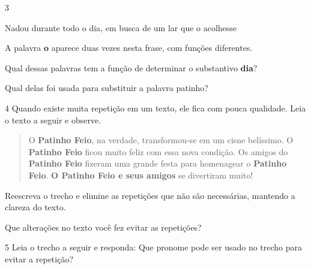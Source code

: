 \num{3}

\begin{mdframed}[linewidth=10pt,linecolor=salmao!20,backgroundcolor=salmao!20,roundcorner=20pt]
Nadou durante todo o dia, em busca de um lar que o acolhesse
\end{mdframed}

A palavra \textbf{o} aparece duas vezes nesta frase, com funções diferentes.

\begin{escolha}
\item Qual dessas palavras tem a função de determinar o substantivo \textbf{dia}?


\item Qual delas foi usada para substituir a palavra patinho?

\end{escolha}

\num{4} Quando existe muita repetição em um texto, ele fica com pouca
qualidade. Leia o texto a seguir e observe.

\begin{quote}
O \textbf{Patinho Feio}, na verdade, transformou-se em um cisne
belíssimo. O \textbf{Patinho Feio} ficou muito feliz com essa nova
condição. Os amigos do \textbf{Patinho Feio} fizeram uma grande festa
para homenagear o \textbf{Patinho Feio}. \textbf{O Patinho Feio e seus
amigos} se divertiram muito!
\end{quote}

\begin{escolha}
\item Reescreva o trecho e elimine as repetições que não são necessárias,
mantendo a clareza do texto.


\item Que alterações no texto você fez evitar as repetições?

\end{escolha}

\num{5} Leia o trecho a seguir e responda: Que pronome pode ser usado 
no trecho para evitar a repetição?

